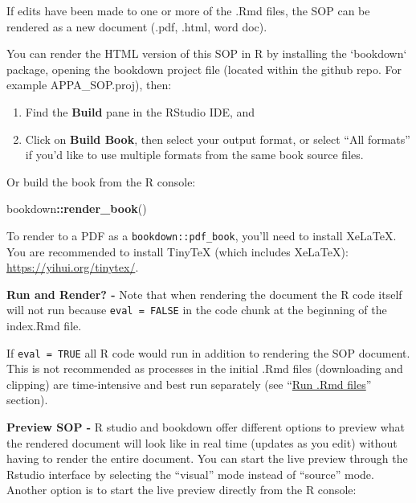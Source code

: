 \documentclass[
]{book}
\newenvironment{Shaded}{\begin{snugshade}}{\end{snugshade}}
\newcommand{\AttributeTok}[1]{\textcolor[rgb]{0.13,0.29,0.53}{#1}}
\newcommand{\ConstantTok}[1]{\textcolor[rgb]{0.56,0.35,0.01}{#1}}
\newcommand{\FunctionTok}[1]{\textcolor[rgb]{0.13,0.29,0.53}{\textbf{#1}}}
\newcommand{\NormalTok}[1]{#1}
\newcommand{\SpecialCharTok}[1]{\textcolor[rgb]{0.81,0.36,0.00}{\textbf{#1}}}
\begin{document}
If edits have been made to one or more of the .Rmd files, the SOP can be rendered as a new document (.pdf, .html, word doc).

You can render the HTML version of this SOP in R by installing the `bookdown` package, opening the bookdown project file (located within the github repo. For example APPA\_SOP.proj), then:

\begin{enumerate}
\def\labelenumi{\arabic{enumi}.}
\item
  Find the \textbf{Build} pane in the RStudio IDE, and
\item
  Click on \textbf{Build Book}, then select your output format, or select ``All formats'' if you'd like to use multiple formats from the same book source files.
\end{enumerate}

Or build the book from the R console:

\begin{Shaded}
\begin{Highlighting}[]
\NormalTok{bookdown}\SpecialCharTok{::}\FunctionTok{render\_book}\NormalTok{()}
\end{Highlighting}
\end{Shaded}

To render to a PDF as a \texttt{bookdown::pdf\_book}, you'll need to install XeLaTeX. You are recommended to install TinyTeX (which includes XeLaTeX): \url{https://yihui.org/tinytex/}.

\textbf{Run and Render? -} Note that when rendering the document the R code itself will not run because \texttt{eval\ =\ FALSE} in the code chunk at the beginning of the index.Rmd file.

\begin{Shaded}
\end{Shaded}

If \texttt{eval\ =\ TRUE} all R code would run in addition to rendering the SOP document. This is not recommended as processes in the initial .Rmd files (downloading and clipping) are time-intensive and best run separately (see ``\protect\hyperlink{run}{Run .Rmd files}'' section).

\textbf{Preview SOP -} R studio and bookdown offer different options to preview what the rendered document will look like in real time (updates as you edit) without having to render the entire document. You can start the live preview through the Rstudio interface by selecting the ``visual'' mode instead of ``source'' mode. Another option is to start the live preview directly from the R console:
\end{document}
